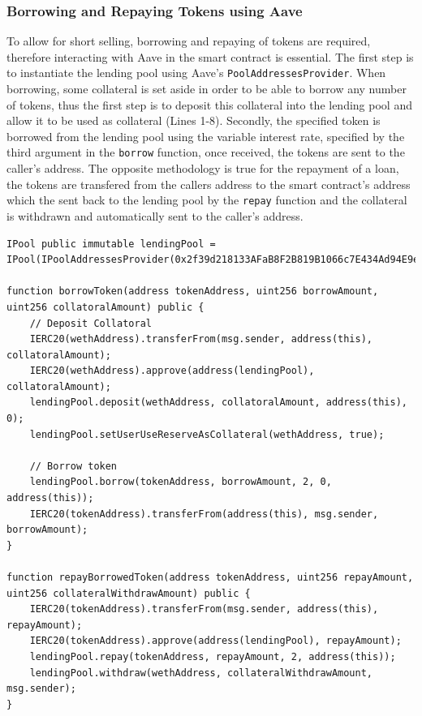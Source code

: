 \subsubsection{Borrowing and Repaying Tokens using Aave}
To allow for short selling, borrowing and repaying of tokens are required, therefore interacting with Aave in the smart contract is essential. The first step is to instantiate the lending pool using Aave's \texttt{PoolAddressesProvider}. When borrowing, some collateral is set aside in order to be able to borrow any number of tokens, thus the first step is to deposit this collateral into the lending pool and allow it to be used as collateral (Lines 1-8). Secondly, the specified token is borrowed from the lending pool using the variable interest rate, specified by the third argument in the \texttt{borrow} function, once received, the tokens are sent to the caller's address. The opposite methodology is true for the repayment of a loan, the tokens are transfered from the callers address to the smart contract's address which the sent back to the lending pool by the \texttt{repay} function and the collateral is withdrawn and automatically sent to the caller's address.
\begin{lstlisting}
IPool public immutable lendingPool = IPool(IPoolAddressesProvider(0x2f39d218133AFaB8F2B819B1066c7E434Ad94E9e).getPool());

function borrowToken(address tokenAddress, uint256 borrowAmount, uint256 collatoralAmount) public {
    // Deposit Collatoral
    IERC20(wethAddress).transferFrom(msg.sender, address(this), collatoralAmount);
    IERC20(wethAddress).approve(address(lendingPool), collatoralAmount);
    lendingPool.deposit(wethAddress, collatoralAmount, address(this), 0);
    lendingPool.setUserUseReserveAsCollateral(wethAddress, true);

    // Borrow token
    lendingPool.borrow(tokenAddress, borrowAmount, 2, 0, address(this));
    IERC20(tokenAddress).transferFrom(address(this), msg.sender, borrowAmount);
}

function repayBorrowedToken(address tokenAddress, uint256 repayAmount, uint256 collateralWithdrawAmount) public {
    IERC20(tokenAddress).transferFrom(msg.sender, address(this), repayAmount);
    IERC20(tokenAddress).approve(address(lendingPool), repayAmount);
    lendingPool.repay(tokenAddress, repayAmount, 2, address(this));
    lendingPool.withdraw(wethAddress, collateralWithdrawAmount, msg.sender);
}
\end{lstlisting}

